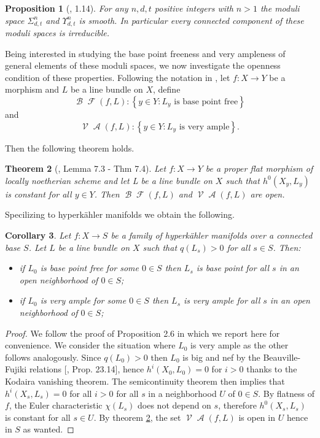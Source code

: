 \documentclass{article}
\DeclareMathOperator{\cA}{\mathcal{A}}
\DeclareMathOperator{\cF}{\mathcal{F}}
\DeclareMathOperator{\cB}{\mathcal{B}}
\DeclareMathOperator{\cV}{\mathcal{V}}
\newtheorem{proposition}{Proposition}[section]
\newtheorem{corollary}[proposition]{Corollary}
\newtheorem{theorem}[proposition]{Theorem}
\begin{document}
\begin{proposition}[\cite{huybrechts1997compacthyperkaehlermanifoldsbasic}, 1.14]\label{prop_irreducibility_connected_components}
    For any $n,d,t$ positive integers with $n>1$ the moduli space $\Sigma_{d,t}^n$ and $\Upsilon_{d,t}^n$ is smooth. In particular every connected component of these moduli spaces is irreducible.
\end{proposition}


Being interested in studying the base point freeness and very ampleness of general elements of these moduli spaces, we now investigate the openness condition of these properties. Following the notation in \cite{nugent2025moduliamplelinebundles}, let $f:X\to Y$ be a morphism and $L$ be a line bundle on $X$, define $$\cB\cF(f,L):\left\{y\in Y: L_y \text{ is base point free}\right\}$$
and 
$$\cV\cA(f,L):\left\{y\in Y: L_y \text{ is very ample}\right\}.$$

Then the following theorem holds.

\begin{theorem}[\cite{nugent2025moduliamplelinebundles}, Lemma 7.3 - Thm 7.4]\label{theorem_openness_bpf_va}
    Let $f:X\to Y$ be a proper flat morphism of locally noetherian scheme and let L be a line bundle on $X$ such that $h^0(X_y,L_y)$ is constant for all $y\in Y$. Then $\cB\cF(f,L)$ and $\cV\cA(f,L)$ are open. 
\end{theorem}

Specilizing to hyperk\"ahler manifolds we obtain the following.

\begin{corollary}\label{cor_openess_of_bpf_va}
Let $f:X\to S$ be a family of hyperk\"ahler manifolds over a connected base $S$. Let $L$ be a line bundle on $X$ such that $q(L_s)>0$ for all $s\in S$. Then:
\begin{itemize}
    \item if $L_0$ is base point free for some $0\in S$ then $L_s$ is base point for all $s$ in an open neighborhood of $0\in S$;
    \item if $L_0$ is very ample for some $0\in S$ then $L_s$ is very ample for all $s$ in an open neighborhood of $0\in S$;
\end{itemize}
\end{corollary}
\begin{proof}
    We follow the proof of Proposition 2.6 in \cite{Varesco_2023} which we report here for convenience. We consider the situation where $L_0$ is very ample as the other follows analogously. Since $q(L_0)>0$ then $L_0$ is big and nef by the Beauville-Fujiki relations [\cite{Gross2003CalabiYau}, Prop. 23.14], hence $h^i(X_0,L_0)=0$ for $i>0$ thanks to the Kodaira vanishing theorem. The semicontinuity theorem then implies that $h^i(X_s,L_s)=0$ for all $i>0$ for all $s$ in a neighborhood $U$ of $0\in S$. By flatness of $f$, the Euler characteristic $\chi(L_s)$ does not depend on $s$, therefore $h^0(X_s,L_s)$ is constant for all $s\in U$. By theorem \ref{theorem_openness_bpf_va}, the set $\cV\cA(f,L)$ is open in $U$ hence in $S$ as wanted.
\end{proof}
\end{document}
